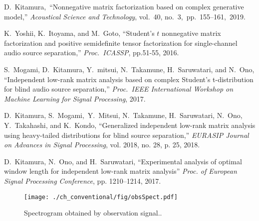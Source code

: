 \documentclass[honka]{nitkagawathesis}%
\begin{document}
\begin{thebibliography}{99}
  D.~Kitamura,~``Nonnegative matrix factorization based on complex generative model,''
  {\em Acoustical Science and Technology}, vol.~40, no.~3,~pp.~155--161,~2019.

  K.~Yoshii, K.~Itoyama, and M.~Goto, ``Student's $t$ nonnegative matrix factorization and positive semidefinite tensor    
  factorization for single-channel audio source separation,''
  {\em Proc.~ICASSP}, pp.51-55, 2016.

  S.~Mogami, D.~Kitamura, Y.~mitsui, N.~Takamune, H.~Saruwatari, and N.~Ono, ``Independent low-rank matrix analysis based on complex Student's t-distribution for blind audio source     separation,''
  {\em Proc.~IEEE International Workshop on Machine Learning for Signal Processing}, 2017. 
 
  D.~Kitamura, S.~Mogami,~Y.~Mitsui, N.~Takamune, H.~Saruwatari, N.~Ono, Y.~Takahashi, and K.~Kondo, 
  ``Generalized independent low-rank matrix analysis using heavy-tailed distributions for blind source separation,''
  {\em EURASIP Journal on Advances in Signal Processing}, vol. 2018, no. 28, p. 25, 2018. 
  
  D.~Kitamura, N.~Ono, and H.~Saruwatari, 
  ``Experimental analysis of optimal window length for independent low-rank matrix analysis'' 
  {\em Proc. of European Signal Processing Conference}, pp. 1210–1214, 2017.

\end{thebibliography}
% 

\begin{figure}[tb]
\centering
\texttt{[image: ./ch\_conventional/fig/obsSpect.pdf]}
\caption{Spectrogram obtained by observation signal..}
\label{fig:obsspect}
\end{figure}

\appendix

%
\end{document}
